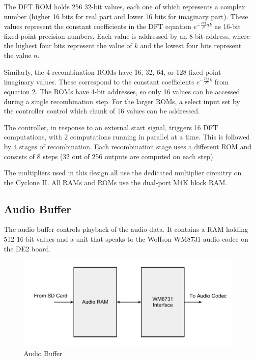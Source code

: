\documentclass{article}
\begin{document}
The DFT ROM holds 256 32-bit values, each one of which represents a
complex number (higher 16 bits for real part and lower 16 bits for
imaginary part). These values represent the constant coefficients
in the DFT equation \(e^{-\frac{2\pi j}{N} n k}\) as 16-bit fixed-point
precision numbers. Each value is addressed by an 8-bit address, where
the highest four bits represent the value of \(k\) and the lowest four bits
represent the value \(n\).

Similarly, the 4 recombination ROMs have 16, 32, 64, or 128 fixed point
imaginary values. These correspond to the constant coefficients
\(e^{-\frac{2\pi j}{N}k}\) from equation 2. The ROMs have 4-bit addresses, 
so only 16 values can be accessed during a single recombination step. 
For the larger ROMs, a select input set by the controller control which 
chunk of 16 values can be addressed.

The controller, in response to an external start signal, triggers
16 DFT computations, with 2 computations running in parallel at a time.
This is followed by 4 stages of recombination. Each recombination stage
uses a different ROM and consists of 8 steps (32 out of 256 outputs are
computed on each step).

The multipliers used in this design all use the dedicated multiplier 
circuitry on the Cyclone II. All RAMs and ROMs use the dual-port M4K
block RAM.
	
\subsection{Audio Buffer}

The audio buffer controls playback of the audio data. It contains a RAM
holding 512 16-bit values and a unit that speaks to the Wolfson WM8731
audio codec on the DE2 board.

\begin{figure}[H]
	\centering
	\includegraphics[scale=0.3]{audio-buffer}
	\caption{Audio Buffer}
\end{figure}
\end{document}
